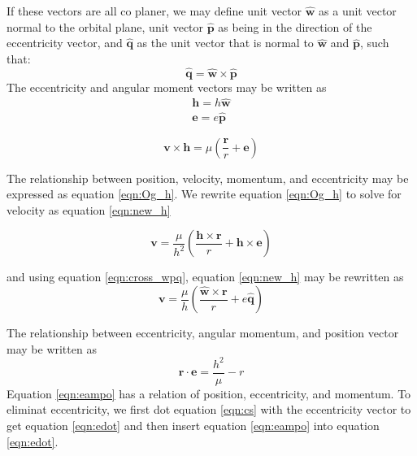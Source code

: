 \documentclass[12pt]{article}
\begin{document}
		
	If these vectors are all co planer, we may define unit vector $\hat{\mathbf{w}}$ as a unit vector normal to the orbital plane, unit vector $\hat{\mathbf{p}}$ as being in the direction of the eccentricity vector, and $\hat{\mathbf{q}}$ as the unit vector that is normal to $\hat{\mathbf{w}}$ and $\hat{\mathbf{p}}$, such that:
	\begin{equation}
	\hat{\mathbf{q}}=\hat{\mathbf{w}}\times\hat{\mathbf{p}}
	\label{eqn:cross_wpq}
	\end{equation}
	The eccentricity and angular moment vectors may be written as 
	\begin{eqnarray}
	\mathbf{h}=h\hat{\mathbf{w}}\\
	\mathbf{e}=e\hat{\mathbf{p}}
	\end{eqnarray}
	
	\begin{equation}
	\mathbf { v } \times \mathbf { h } = \mu \left( \frac { \mathbf { r } } { r } + \mathbf { e } \right)
	\label{eqn:Og_h}
	\end{equation}
	
	The relationship between position, velocity, momentum, and eccentricity may be expressed as equation \ref{eqn:Og_h}. We rewrite equation \ref{eqn:Og_h} to solve for velocity as equation \ref{eqn:new_h}
	
	\begin{equation}
	\mathbf { v } = \frac { \mu } { h ^ { 2 } } \left( \frac { \mathbf { h } \times \mathbf { r } } { r } + \mathbf { h } \times \mathbf { e } \right)
	\label{eqn:new_h}
	\end{equation}

	
		and using equation \ref{eqn:cross_wpq}, equation \ref{eqn:new_h} may be rewritten as
	 \begin{equation}
	 \mathbf { v } = \frac { \mu } { h } \left( \frac { \hat { \mathbf { w } } \times \mathbf { r } } { r } + e \hat { \mathbf { q } } \right)
	 \end{equation}
	 
	 The relationship between eccentricity, angular momentum, and position vector may be written as 
	 \begin{equation}
	 \mathbf { r } \cdot \mathbf { e } = \frac { h ^ { 2 } } { \mu } - r 
	 \label{eqn:eampo}
	 \end{equation}
	 Equation \ref{eqn:eampo} has a relation of position, eccentricity, and momentum. To eliminat eccentricity, we first dot equation \ref{eqn:cs} with the eccentricity vector to get equation \ref{eqn:edot} and then insert equation \ref{eqn:eampo} into equation \ref{eqn:edot}.
	 
\end{document}
